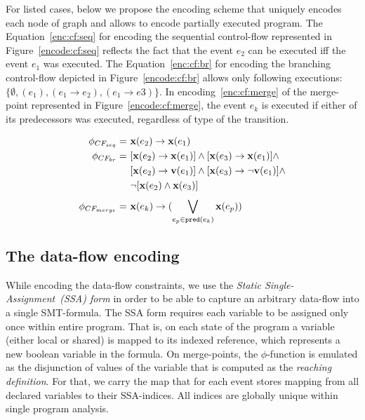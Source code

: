 For listed cases, below we propose the encoding scheme that uniquely encodes each node of graph and allows to encode partially executed program.
The Equation~\ref{enc:cf:seq} for encoding the sequential control-flow represented in Figure~\ref{encode:cf:seq} reflects the fact that the event $e_2$ can be executed iff the event $e_1$ was executed. The Equation~\ref{enc:cf:br} for encoding the branching control-flow depicted in Figure~\ref{encode:cf:br} allows only following executions: $\{\emptyset, (e_1), (e_1 \rightarrow e_2), (e_1 \rightarrow e3) \}$. In encoding~\ref{enc:cf:merge} of the merge-point represented in Figure~\ref{encode:cf:merge}, the event $e_k$ is executed if either of its predecessors was executed, regardless of type of the transition.

\begin{align}
\phi_{CF_{seq}}   = \ & \mathbf{x}(e_2) \rightarrow \mathbf{x}(e_1) \label{enc:cf:seq} \\
\phi_{CF_{br}}    = \ & [\mathbf{x}(e_2) \rightarrow \mathbf{x}(e_1)] \land [\mathbf{x}(e_3) \rightarrow \mathbf{x}(e_1)] \land \nonumber \\
				  &  [\mathbf{x}(e_2) \rightarrow \mathbf{v}(e_1)] \land [\mathbf{x}(e_3) \rightarrow \lnot\mathbf{v}(e_1)] \land \nonumber \\
				  & \lnot [\mathbf{x}(e_2) \land \mathbf{x}(e_3)]  \label{enc:cf:br} \\
\phi_{CF_{merge}} = \ & \mathbf{x}(e_k) \rightarrow (\bigvee\limits_{e_p \in \mathtt{pred}(e_k)}^{} \mathbf{x}(e_p)) \label{enc:cf:merge}
\end{align}

\subsection{The data-flow encoding} %
\label{ch:port:enc:df}

While encoding the data-flow constraints, we use the \textit{Static Single-Assignment~(SSA) form} in order to be able to capture an arbitrary data-flow into a single SMT-formula. The SSA form requires each variable to be assigned only once within entire program. That is, on each state of the program a variable (either local or shared) is mapped to its indexed reference, which represents a new boolean variable in the formula. On merge-points, the $\phi$-function is emulated as the disjunction of values of the variable that is computed as the \textit{reaching definition}. For that, we carry the map that for each event stores mapping from all declared variables to their SSA-indices. All indices are globally unique within single program analysis.

